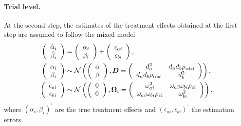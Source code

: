 \documentclass[]{scrartcl}\usepackage[]{graphicx}\usepackage[]{color}
\begin{document}
{{\paragraph{Trial level.}
At the second step, the estimates of the treatment effects 
  obtained at the first step are assumed to follow the mixed model
  \begin{align}
    \left(\begin{array}{c} 
      {\hat\alpha_i}\\ {\hat\beta_i}\end{array}\right)
    &= \left(\begin{array}{c} \alpha_i\\ \beta_i\end{array}\right) +
      \left(\begin{array}{c} \epsilon_{ai}\\ \epsilon_{bi}\end{array}\right),
    \\
    \left(\begin{array}{c} {\alpha_i}\\ {\beta_i}\end{array}\right)
    & \sim \mathcal N
      \left(
      \left(\begin{array}{c}
      \alpha\\ \beta\end{array}\right), 
      \bm D = \left(\begin{array}{cc} 
      d_a^2 &
      d_a d_b{\rho_\text{\tiny trial}} \\
      d_a d_b{\rho_\text{\tiny trial}} &
      d_b^2 \\
      \end{array}\right)
      \right),
      \label{eq:trtEffs}
    \\
    \left(\begin{array}{c} \epsilon_{ai}\\ \epsilon_{bi}\end{array}\right)
    &\sim \mathcal N \left(
      \left(\begin{array}{c}0\\0\end{array}\right),
      \bm\Omega_i = \left(\begin{array}{cc} 
            \omega_{ai}^2 &
            \omega_{ai} \omega_{bi} {\rho_{\epsilon i}} \\
            \omega_{ai} \omega_{bi} {\rho_{\epsilon i}} &
            \omega_{bi}^2 \\
        \end{array}\right)\right).
  \end{align}
  where $(\alpha_i, \beta_i)^\prime$ are the true treatment effects
  and $(\epsilon_{ai}, \epsilon_{bi})^\prime$ the estimation errors.

}}
\end{document}
